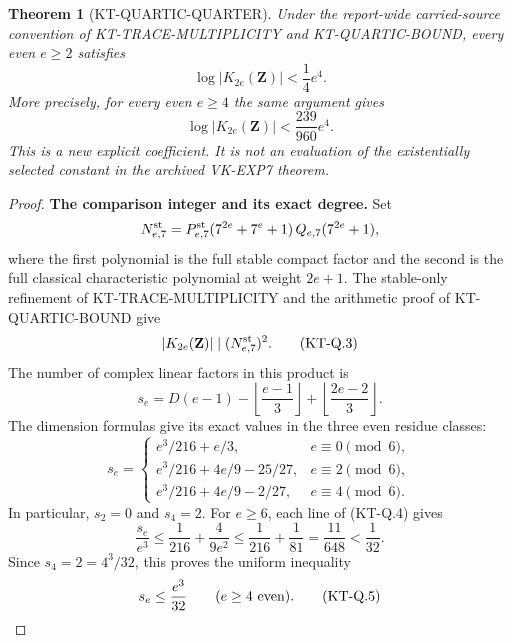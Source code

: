 \documentclass[11pt,a4paper]{article}
\newtheorem{theorem}{Theorem}[section]
\theoremstyle{definition}
\renewcommand{\paragraph}[1]{\par\smallskip\noindent\textbf{#1}\quad\ignorespaces}
\begin{document}
\begin{theorem}[KT-QUARTIC-QUARTER]
Under the report-wide carried-source convention of
KT-TRACE-MULTIPLICITY and KT-QUARTIC-BOUND, every even
$e\geq2$ satisfies
\[
             \log|K_{2e}(\mathbf Z)|<\frac14e^4.          \tag{KT-Q.1}
\]
More precisely, for every even $e\geq4$ the same argument gives
\[
             \log|K_{2e}(\mathbf Z)|<\frac{239}{960}e^4.
                                                               \tag{KT-Q.2}
\]
This is a new explicit coefficient.  It is not an evaluation
of the existentially selected constant in the archived
VK-EXP7 theorem.
\end{theorem}
\begin{proof}
\paragraph{The comparison integer and its exact degree.}
Set
\[
 N^{\rm st}_{e,7}
  =P^{\rm st}_{e,7}(7^{2e}+7^e+1)\,
                    Q_{e,7}(7^{2e}+1),
\]
where the first polynomial is the full stable compact factor
and the second is the full classical characteristic polynomial
at weight $2e+1$.  The stable-only refinement of
KT-TRACE-MULTIPLICITY and the arithmetic proof of
KT-QUARTIC-BOUND give
\[
             |K_{2e}(\mathbf Z)|\mid(N^{\rm st}_{e,7})^2.
                                                               \tag{KT-Q.3}
\]
The number of complex linear factors in this product is
\[
 s_e=D(e-1)-\left\lfloor\frac{e-1}{3}\right\rfloor
                  +\left\lfloor\frac{2e-2}{3}\right\rfloor.
\]
The dimension formulas give its exact values in the three
even residue classes:
\[
 s_e=\begin{cases}
 e^3/216+e/3,&e\equiv0\pmod6,\\
 e^3/216+4e/9-25/27,&e\equiv2\pmod6,\\
 e^3/216+4e/9-2/27,&e\equiv4\pmod6.
 \end{cases}                                                  \tag{KT-Q.4}
\]
In particular, $s_2=0$ and $s_4=2$.
For $e\geq6$, each line of (KT-Q.4) gives
\[
 \frac{s_e}{e^3}\leq\frac1{216}+\frac4{9e^2}
       \leq\frac1{216}+\frac1{81}
       =\frac{11}{648}<\frac1{32}.
\]
Since $s_4=2=4^3/32$, this proves the uniform inequality
\[
                       s_e\leq\frac{e^3}{32}
                   \qquad(e\geq4\hbox{ even}).                \tag{KT-Q.5}
\]


\end{proof}
\end{document}
